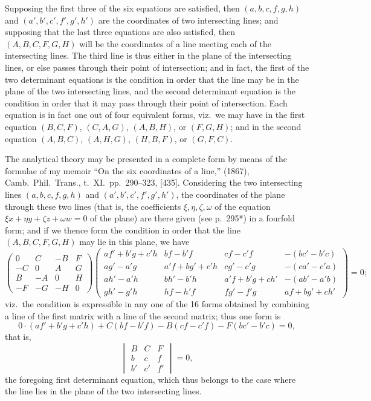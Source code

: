 \documentclass[11pt,a4paper]{article}
\theoremstyle{plain}
\begin{document}
Supposing the first three of the six equations are satisfied, then $(a, b, c, f, g, h)$ and $(a', b', c', f', g', h')$ are the coordinates of two intersecting lines; and supposing that the last three equations are also satisfied, then $(A, B, C, F, G, H)$ will be the coordinates of a line meeting each of the intersecting lines. The third line is thus either in the plane of the intersecting lines, or else passes through their point of intersection; and in fact, the first of the two determinant equations is the condition in order that the line may be in the plane of the two intersecting lines, and the second determinant equation is the condition in order that it may pass through their point of intersection. Each equation is in fact one out of four equivalent forms, viz.\ we may have in the first equation $(B, C, F)$, $(C, A, G)$, $(A, B, H)$, or $(F, G, H)$; and in the second equation $(A, B, C)$, $(A, H, G)$, $(H, B, F)$, or $(G, F, C)$.

The analytical theory may be presented in a complete form by means of the formulae of my memoir ``On the six coordinates of a line,'' (1867), Camb.\ Phil.\ Trans., t.\ XI.\ pp.\ 290--323, [435]. Considering the two intersecting lines $(a, b, c, f, g, h)$ and $(a', b', c', f', g', h')$, the coordinates of the plane through these two lines (that is, the coefficients $\xi, \eta, \zeta, \omega$ of the equation $\xi x + \eta y + \zeta z + \omega w = 0$ of the plane) are there given (see p.\ 295*) in a fourfold form; and if we thence form the condition in order that the line $(A, B, C, F, G, H)$ may lie in this plane, we have
$$
\begin{pmatrix}
0 & C & -B & F \\
-C & 0 & A & G \\
B & -A & 0 & H \\
-F & -G & -H & 0
\end{pmatrix}
\begin{pmatrix}
af' + b'g + c'h & bf - b'f & cf - c'f & -(bc' - b'c) \\
ag' - a'g & a'f + bg' + c'h & cg' - c'g & -(ca' - c'a) \\
ah' - a'h & bh' - b'h & a'f + b'g + ch' & -(ab' - a'b) \\
gh' - g'h & hf - h'f & fg' - f'g & af + bg' + ch'
\end{pmatrix}
= 0;
$$
viz.\ the condition is expressible in any one of the 16 forms obtained by combining a line of the first matrix with a line of the second matrix; thus one form is
$$
0 \cdot (af' + b'g + c'h) + C(bf - b'f) - B(cf - c'f) - F(bc' - b'c) = 0,
$$
that is,
$$
\begin{vmatrix} B & C & F \\ b & c & f \\ b' & c' & f' \end{vmatrix} = 0,
$$
the foregoing first determinant equation, which thus belongs to the case where the line lies in the plane of the two intersecting lines.
\end{document}
